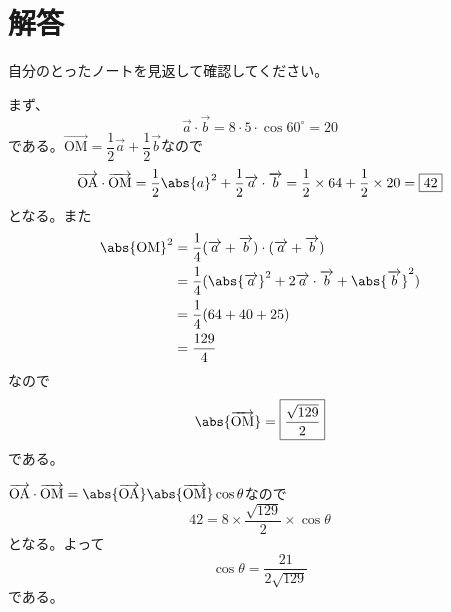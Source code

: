 \documentclass[dvipdfmx,uplatex,b5paper]{jsarticle}
\newcommand{\Vector}[1]{\overrightarrow{\text{#1}}}
\newcommand{\innerprod}[2]{\overrightarrow{#1}\cdot\overrightarrow{#2}}
\newcommand{\Innerprod}[2]{\Vector{#1}\cdot\Vector{#2}}
\begin{document}
\section*{解答}
\begin{enumarabicp}
  \item 自分のとったノートを見返して確認してください。
  \item \begin{enumromanp}
    \item まず、
    \[ \overrightarrow{a}\cdot\overrightarrow{b} = 8\cdot 5\cdot \cos 60^\circ = 20 \]
    である。$\Vector{OM}=\dfrac{1}{2}\overrightarrow{a}+\dfrac{1}{2}\overrightarrow{b}$なので
    \begin{align*}
      \Vector{OA}\cdot\Vector{OM}=\frac{1}{2}\abs{a}^2+\frac{1}{2}\overrightarrow{a}\cdot \overrightarrow{b}
      = \frac{1}{2}\times 64+\frac{1}{2}\times 20 = \boxed{42}
    \end{align*}
    となる。また
    \begin{align*}
      \abs{\text{OM}}^2 &= \frac{1}{4}(\overrightarrow{a}+\overrightarrow{b})\cdot (\overrightarrow{a}+\overrightarrow{b}) \\
      &= \frac{1}{4}(\abs{\overrightarrow{a}}^2+2\innerprod{a}{b}+\abs{\overrightarrow{b}}^2) \\
      &= \frac{1}{4}(64+40+25) \\
      &= \frac{129}{4}
    \end{align*}
    なので\[ \abs{\Vector{OM}}=\boxed{\dfrac{\sqrt{129}}{2}} \]である。

    \item $\Innerprod{OA}{OM}=\abs{\Vector{OA}}\abs{\Vector{OM}}\cos\theta$なので
    \[ 42 = 8\times \frac{\sqrt{129}}{2}\times \cos\theta \]
    となる。よって
    \[ \cos \theta = \boxed{\frac{21}{2\sqrt{129}}} \]
    である。
  \end{enumromanp}
\end{enumarabicp}
\end{document}
